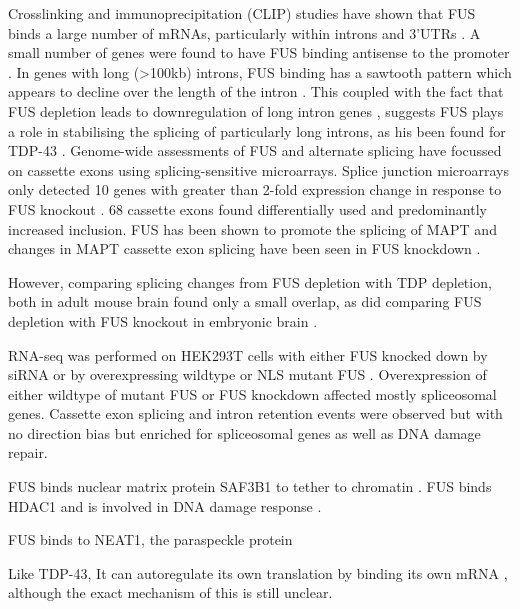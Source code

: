 
Crosslinking and immunoprecipitation (CLIP) studies have shown that FUS binds a large number of mRNAs, particularly within introns and 3'UTRs \citep{Lagier-Tourenne2012,Rogelj2012,Ishigaki2012}.
A small number of genes were found to have FUS binding antisense to the promoter \citep{Ishigaki2012}.
In genes with long (>100kb) introns, FUS binding has a sawtooth pattern which appears to decline over the length of the intron \citep{Rogelj2012}. 
This coupled with the fact that FUS depletion leads to downregulation of long intron genes \citep{Lagier-Tourenne2012}, suggests FUS plays a role in stabilising the splicing of particularly long introns, as his been found for TDP-43 \citep{Polymenidou2011}.
Genome-wide assessments of FUS and alternate splicing have focussed on cassette exons using splicing-sensitive microarrays. 
Splice junction microarrays only detected 10 genes with greater than 2-fold expression change in response to FUS knockout \citep{Rogelj2012}. 68 cassette exons found differentially used and predominantly increased inclusion. 
FUS has been shown to promote the splicing of MAPT \citep{Orozco2012} and changes in MAPT cassette exon splicing have been seen in FUS knockdown \citep{Ishigaki2012, Scekic-zahirovic2016}.


However, comparing splicing changes from FUS depletion with TDP depletion, both in adult mouse brain found only a small overlap, as did comparing FUS depletion with FUS knockout in embryonic brain  \citep{Lagier-Tourenne2012}.


RNA-seq was performed on HEK293T cells with either FUS knocked down by siRNA or by overexpressing wildtype or NLS mutant FUS \citep{VanBlitterswijk2013}.  
Overexpression of either wildtype of mutant FUS or FUS knockdown affected mostly spliceosomal genes. 
Cassette exon splicing and intron retention events were observed but with no direction bias but enriched for spliceosomal genes as well as DNA damage repair.






FUS binds nuclear matrix protein SAF3B1 to tether to chromatin \citep{Yamaguchi2016}.
FUS binds HDAC1 and is involved in DNA damage response \citep{Wang2013}.


FUS binds to NEAT1, the paraspeckle protein \citep{Nishimoto2013}



 Like TDP-43, It can autoregulate its own translation by binding its own mRNA \citep{Zhou2013}, although the exact mechanism of this is still unclear.


